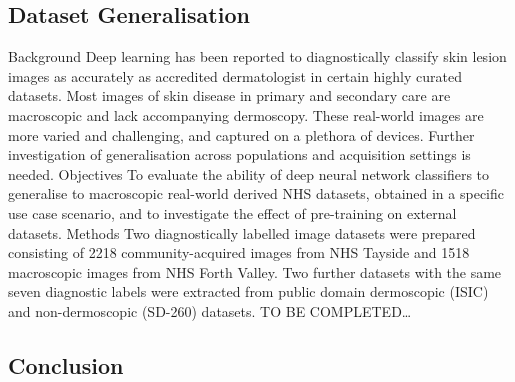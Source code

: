 \subsection*{Dataset Generalisation}
Background Deep learning has been reported to diagnostically classify skin lesion images as accurately as accredited dermatologist in certain highly curated datasets. Most images of skin disease in primary and secondary care are macroscopic and lack accompanying dermoscopy. These real-world images are more varied and challenging, and captured on a plethora of devices. Further investigation of generalisation across populations and acquisition settings is needed. 
Objectives To evaluate the ability of deep neural network classifiers to generalise to macroscopic real-world derived NHS datasets, obtained in a specific use case scenario, and to investigate the effect of pre-training on external datasets. 
Methods Two diagnostically labelled image datasets were prepared consisting of 2218 community-acquired images from NHS Tayside and 1518 macroscopic images from NHS Forth Valley. Two further datasets with the same seven diagnostic labels were extracted from public domain dermoscopic (ISIC) and non-dermoscopic (SD-260) datasets. TO BE COMPLETED…

\subsection*{Conclusion}
